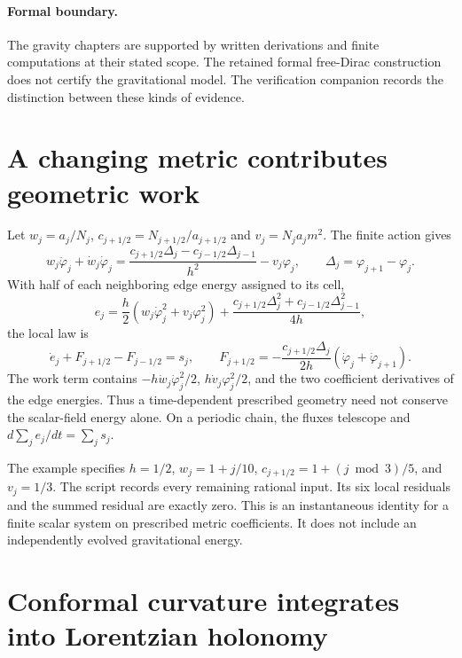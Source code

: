 \paragraph{Formal boundary.}
The gravity chapters are supported by written derivations and finite computations at their stated scope. The retained formal free-Dirac construction does not certify the gravitational model. The verification companion records the distinction between these kinds of evidence.

\clearpage
\section{A changing metric contributes geometric work}

Let $w_j=a_j/N_j$, $c_{j+1/2}=N_{j+1/2}/a_{j+1/2}$ and $v_j=N_ja_jm^2$. The finite action gives
\[
w_j\ddot\varphi_j+\dot w_j\dot\varphi_j
=\frac{c_{j+1/2}\Delta_j-c_{j-1/2}\Delta_{j-1}}{h^2}
-v_j\varphi_j,
\qquad \Delta_j=\varphi_{j+1}-\varphi_j.
\]
With half of each neighboring edge energy assigned to its cell,
\[
e_j=\frac h2(w_j\dot\varphi_j^2+v_j\varphi_j^2)
+\frac{c_{j+1/2}\Delta_j^2+c_{j-1/2}\Delta_{j-1}^2}{4h},
\]
the local law is
\[
\dot e_j+F_{j+1/2}-F_{j-1/2}=s_j,
\qquad
F_{j+1/2}=-\frac{c_{j+1/2}\Delta_j}{2h}
(\dot\varphi_j+\dot\varphi_{j+1}).
\]
The work term contains $-h\dot w_j\dot\varphi_j^2/2$, $h\dot v_j\varphi_j^2/2$, and the two coefficient derivatives of the edge energies. Thus a time-dependent prescribed geometry need not conserve the scalar-field energy alone. On a periodic chain, the fluxes telescope and $d\sum_j e_j/dt=\sum_j s_j$.

The example specifies $h=1/2$, $w_j=1+j/10$, $c_{j+1/2}=1+(j\bmod3)/5$, and $v_j=1/3$. The script records every remaining rational input. Its six local residuals and the summed residual are exactly zero. This is an instantaneous identity for a finite scalar system on prescribed metric coefficients. It does not include an independently evolved gravitational energy.



\clearpage
\section{Conformal curvature integrates into Lorentzian holonomy}

